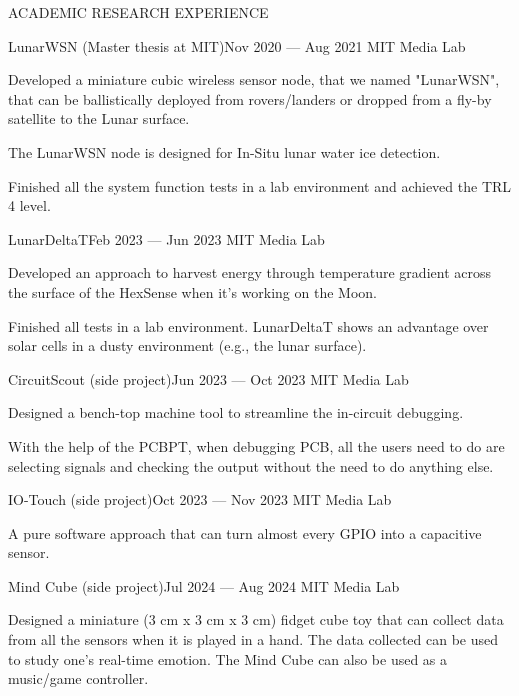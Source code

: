 \documentclass{resume} %
\begin{document}
\begin{rSection}{ACADEMIC RESEARCH EXPERIENCE}
\begin{rSubsection}{LunarWSN (Master thesis at MIT)}{Nov 2020 --- Aug 2021}{ }{MIT Media Lab}
\item Developed a miniature cubic wireless sensor node, that we named "LunarWSN",
      that can be ballistically deployed from rovers/landers or dropped from a fly-by satellite to the Lunar surface.
\item The LunarWSN node is designed for In-Situ lunar water ice detection.
\item Finished all the system function tests in a lab environment and achieved the TRL 4 level.
\end{rSubsection}

\begin{rSubsection}{LunarDeltaT}{Feb 2023 --- Jun 2023}{ }{MIT Media Lab}
\item Developed an approach to harvest energy through temperature gradient across
      the surface of the HexSense when it's working on the Moon.
\item Finished all tests in a lab environment.
      LunarDeltaT shows an advantage over solar cells in a dusty environment (e.g., the lunar surface).
\end{rSubsection}

\begin{rSubsection}{CircuitScout (side project)}{Jun 2023 --- Oct 2023}{ }{MIT Media Lab}
\item Designed a bench-top machine tool to streamline the in-circuit debugging.
\item With the help of the PCBPT, when debugging PCB,
all the users need to do are selecting signals and checking the output without the need to do anything else.
\end{rSubsection}

\begin{rSubsection}{IO-Touch (side project)}{Oct 2023 --- Nov 2023}{ }{MIT Media Lab}
\item A pure software approach that can turn almost every GPIO into a capacitive sensor.
\end{rSubsection}

\begin{rSubsection}{Mind Cube (side project)}{Jul 2024 --- Aug 2024}{ }{MIT Media Lab}
\item Designed a miniature (3 cm x 3 cm x 3 cm) fidget cube toy that can collect data from all the sensors when it is
played in a hand. The data collected can be used to study one's real-time emotion.
The Mind Cube can also be used as a music/game controller.
\end{rSubsection}

\end{rSection}
\end{document}
